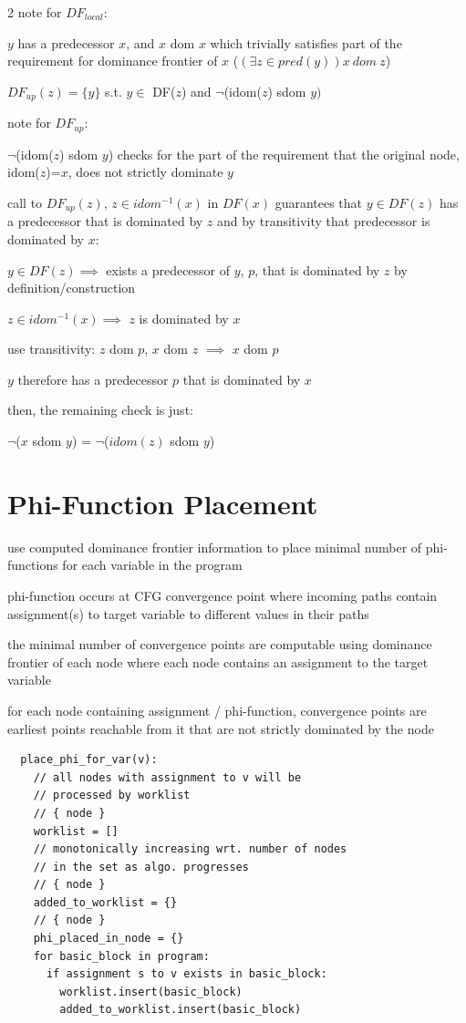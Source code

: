 \documentclass[8pt]{extarticle}
\begin{document}
\begin{multicols*}{2}
  note for $DF_{local}$:

  $y$ has a predecessor $x$, and $x$ dom $x$ which trivially satisfies part of the requirement for dominance frontier of $x$ ($(\exists z \in pred(y)) x \ dom\ z$)

  $DF_{up}(z) = \{ y \}$ s.t. $y \in$ DF($z$) and $\neg$(idom($z$) sdom $y)$

  note for $DF_{up}$:

  $\neg$(idom($z$) sdom $y$) checks for the part of the requirement that the original node, idom($z$)=$x$, does not strictly dominate $y$

  call to $DF_{up}(z)$, $z \in idom^{-1}(x)$ in $DF(x)$ guarantees that $y \in DF(z)$ has a predecessor that is dominated by $z$ and by transitivity that predecessor is dominated by $x$:

  $y \in DF(z) \implies$ exists a predecessor of $y$, $p$, that is dominated by $z$ by definition/construction

  $z \in idom^{-1}(x) \implies $ $z$ is dominated by $x$

  use transitivity: $z$ dom $p$, $x$ dom $z$ $\implies$ $x$ dom $p$

  $y$ therefore has a predecessor $p$ that is dominated by $x$

  then, the remaining check is just:

  $\neg$($x$ sdom $y$) = $\neg$($idom(z)$ sdom $y$)

  \vfill\null
  \columnbreak
    
  \section{Phi-Function Placement}

  use computed dominance frontier information to place minimal number of phi-functions for each variable in the program

  phi-function occurs at CFG convergence point where incoming paths contain assignment(s) to target variable to different values in their paths

  the minimal number of convergence points are computable using dominance frontier of each node where each node contains an assignment to the target variable

  for each node containing assignment / phi-function, convergence points are earliest points reachable from it that are not strictly dominated by the node

  \begin{verbatim}
  place_phi_for_var(v):
    // all nodes with assignment to v will be
    // processed by worklist
    // { node }
    worklist = []
    // monotonically increasing wrt. number of nodes
    // in the set as algo. progresses
    // { node }
    added_to_worklist = {}
    // { node }
    phi_placed_in_node = {}
    for basic_block in program:
      if assignment s to v exists in basic_block:
        worklist.insert(basic_block)
        added_to_worklist.insert(basic_block)


\end{verbatim}
\end{multicols*}
\end{document}
